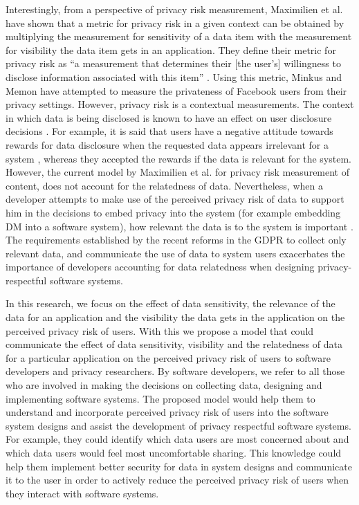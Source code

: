 \documentclass[10pt]{article}
\begin{document}
Interestingly, from a perspective of privacy risk measurement, Maximilien et al. \cite {maximilien2009privacy} have shown that a metric for privacy risk in a given context can be obtained by multiplying the measurement for sensitivity of a data item with the measurement for visibility the data item gets in an application. They define their metric for privacy risk as \enquote{a measurement that determines their [the user's] willingness to disclose information associated with this item} \cite {maximilien2009privacy}. Using this metric, Minkus and Memon \cite{minkus2014scale} have attempted to measure the privateness of Facebook users from their privacy settings. However, privacy risk is a contextual measurements. The context in which data is being disclosed \cite {nissenbaum2009privacy, john2010strangers} is known to have an effect on user disclosure decisions \cite {knijnenburg2013making, malheiros2013fairly}. For example, it is said that users have a negative attitude towards rewards for data disclosure when the requested data appears irrelevant for a system \cite {li2010understanding}, whereas they accepted the rewards if the data is relevant for the system. However, the current model by Maximilien et al. \cite {maximilien2009privacy} for privacy risk measurement of content, does not account for the relatedness of data. Nevertheless, when a developer attempts to make use of the perceived privacy risk of data to support him in the decisions to embed privacy into the system (for example embedding DM into a software system), how relevant the data is to the system is important \cite {senarath2018under}. The requirements established by the recent reforms in the GDPR to collect only relevant data, and communicate the use of data to system users \cite {wagner2016national} exacerbates the importance of developers accounting for data relatedness when designing privacy-respectful software systems.

In this research, we focus on the effect of data sensitivity, the relevance of the data for an application and the visibility the data gets in the application on the perceived privacy risk of users. With this we propose a model that could communicate the effect of data sensitivity, visibility and the relatedness of data for a particular application on the perceived privacy risk of users to software developers and privacy researchers. By software developers, we refer to all those who are involved in making the decisions on collecting data, designing and implementing software systems. The proposed model would help them to understand and incorporate perceived privacy risk of users into the software system designs and assist the development of privacy respectful software systems. For example, they could identify which data users are most concerned about and which data users would feel most uncomfortable sharing. This knowledge could help them implement better security for data in system designs and communicate it to the user in order to actively reduce the perceived privacy risk of users when they interact with software systems.
\end{document}
